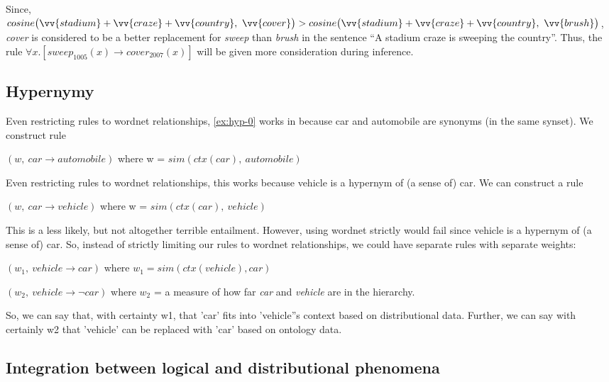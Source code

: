 Since, $cosine\big(\vv{stadium} + \vv{craze} + \vv{country},~
\vv{cover}\big) > cosine\big(\vv{stadium} + \vv{craze} + \vv{country},~
\vv{brush}\big)$, {\it cover} is considered to be a better replacement for {\it
sweep} than {\it brush} in the sentence ``A stadium craze is sweeping the
country''.  Thus, the rule $\forall x.[sweep_{1005}(x) \to cover_{2007}(x)]$
will be given more consideration during inference.


\subsection*{Hypernymy}

	
Even restricting rules to wordnet relationships, \eqref{ex:hyp-0} works in
because car and automobile are synonyms (in the same synset).
We construct rule 

$(w,~ car \to automobile)$ where w = $sim(ctx(car),~ automobile)$


Even restricting rules to wordnet relationships, this works because vehicle
is a hypernym of (a sense of) car.
We can construct a rule 

$(w,~ car \to vehicle)$ where w = $sim(ctx(car),~ vehicle)$


This is a less likely, but not altogether terrible entailment.
However, using wordnet strictly would fail since vehicle is a hypernym of (a
sense of) car.
So, instead of strictly limiting our rules to wordnet relationships, we could
have separate rules with separate weights:

$(w_1,~ vehicle \to car)$ where $w_1 = sim(ctx(vehicle), car)$ 

$(w_2,~ vehicle \to \lnot car)$ where $w_2$ = a measure of how far {\it car} and
{\it vehicle} are in the hierarchy.

So, we can say that, with certainty w1, that 'car' fits into 'vehicle''s context
based on distributional data.
Further, we can say with certainly w2 that 'vehicle' can be replaced with 'car'
based on ontology data.



\subsection*{Integration between logical and distributional phenomena}



